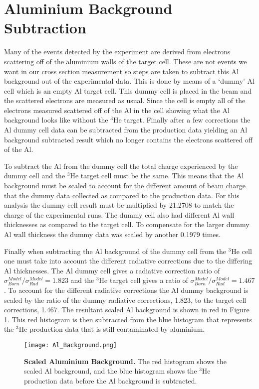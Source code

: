 \section{Aluminium Background Subtraction}
\label{sec:al}

Many of the events detected by the experiment are derived from electrons scattering off of the aluminium walls of the target cell. These are not events we want in our cross section measurement so steps are taken to subtract this Al background out of the experimental data. This is done by means of a `dummy' Al cell which is an empty Al target cell. This dummy cell is placed in the beam and the scattered electrons are measured as usual. Since the cell is empty all of the electrons measured scattered off of the Al in the cell showing what the Al background looks like without the $^3$He target. Finally after a few corrections the Al dummy cell data can be subtracted from the production data yielding an Al background subtracted result which no longer contains the electrons scattered off of the Al.

To subtract the Al from the dummy cell the total charge experienced by the dummy cell and the $^3$He target cell must be the same. This means that the Al background must be scaled to account for the different amount of beam charge that the dummy data collected as compared to the production data. For this analysis the dummy cell result must be multiplied by 21.2708 to match the charge of the experimental runs. The dummy cell also had different Al wall thicknesses as compared to the target cell. To compensate for the larger dummy Al wall thickness the dummy data was scaled by another 0.1979 times.

Finally when subtracting the Al background of the dummy cell from the $^3$He cell one must take into account the different radiative corrections due to the differing Al thicknesses. The Al dummy cell gives a radiative correction ratio of $\sigma^{Model}_{Born}/\sigma^{Model}_{Rad} = 1.823$ and the $^3$He target cell gives a ratio of $\sigma^{Model}_{Born}/\sigma^{Model}_{Rad} = 1.467$. To account for the different radiative corrections the Al dummy background is scaled by the ratio of the dummy radiative corrections, 1.823, to the target cell corrections, 1.467. The resultant scaled Al background is shown in red in Figure \ref{fig:al}. This red histogram is then subtracted from the blue histogram that represents the $^3$He production data that is still contaminated by aluminium. 

\begin{figure}[!ht]
\begin{center}
\texttt{[image: Al\_Background.png]}
\end{center}
\caption[Scaled Aluminium Background]{
{\bf{Scaled Aluminium Background.}} The red histogram shows the scaled Al background, and the blue histogram shows the $^3$He production data before the Al background is subtracted.}
\label{fig:al}
\end{figure}


